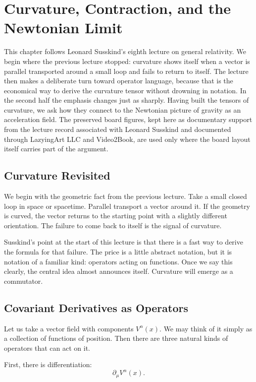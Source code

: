 \chapter{Curvature, Contraction, and the Newtonian Limit}

This chapter follows Leonard Susskind's eighth lecture on general relativity. We begin where the previous lecture stopped: curvature shows itself when a vector is parallel transported around a small loop and fails to return to itself. The lecture then makes a deliberate turn toward operator language, because that is the economical way to derive the curvature tensor without drowning in notation. In the second half the emphasis changes just as sharply. Having built the tensors of curvature, we ask how they connect to the Newtonian picture of gravity as an acceleration field. The preserved board figures, kept here as documentary support from the lecture record associated with Leonard Susskind and documented through LazyingArt LLC and Video2Book, are used only where the board layout itself carries part of the argument.

\section{Curvature Revisited}

We begin with the geometric fact from the previous lecture. Take a small closed loop in space or spacetime. Parallel transport a vector around it. If the geometry is curved, the vector returns to the starting point with a slightly different orientation. The failure to come back to itself is the signal of curvature.

Susskind's point at the start of this lecture is that there is a fast way to derive the formula for that failure. The price is a little abstract notation, but it is notation of a familiar kind: operators acting on functions. Once we say this clearly, the central idea almost announces itself. Curvature will emerge as a commutator.

\section{Covariant Derivatives as Operators}

Let us take a vector field with components \(V^\alpha(x)\). We may think of it simply as a collection of functions of position. Then there are three natural kinds of operators that can act on it.

First, there is differentiation:
\begin{equation}
\partial_\mu V^\alpha(x).
\end{equation}

